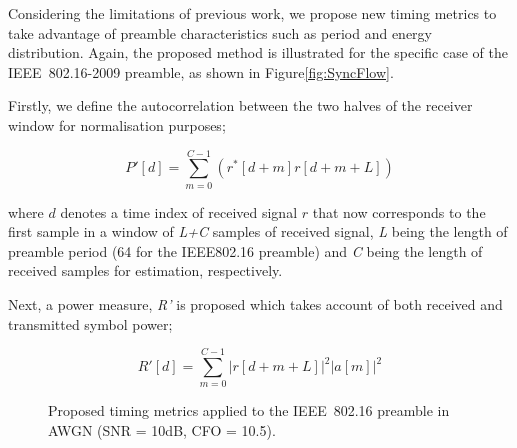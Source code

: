 Considering the limitations of previous work, we propose new timing metrics to take advantage of preamble characteristics such as period and energy distribution.
Again, the proposed method is illustrated for the specific case of the IEEE~802.16-2009 preamble, as shown in Figure\ref{fig:SyncFlow}.

Firstly, we define the autocorrelation between the two halves of the receiver window for normalisation purposes;

\begin{equation}
\label{ProposedP}
P'[d] =\sum_{m =0}^{C-1}    (r^{*}[d+m] r[d+m+L] )
\end{equation}

where $d$ denotes a time index of received signal $r$ that now corresponds to the first sample in a window of \emph{L+C} samples of received signal, \emph{L} being the length of preamble period (64 for the IEEE802.16 preamble) and \emph{C} being the length of received samples for estimation, respectively.

Next, a power measure, \emph{R'} is proposed which takes account of both received and transmitted symbol power;

\begin{equation}
\label{ProposedR}
R'[d] =\sum_{m =0}^{C-1}   |r[d+m+L]|^2  |a[m]|^2
\end{equation}


\begin{figure}
\centering
	\caption{Proposed timing metrics applied to the IEEE~802.16 preamble in AWGN (SNR = 10{\thinspace}dB, CFO = 10.5).}
	\label{fig:ProposedMetric-10dB}
\end{figure}


